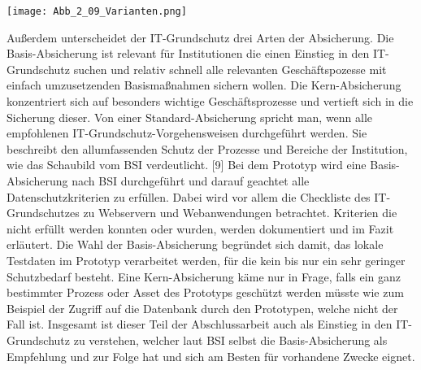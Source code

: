 \texttt{[image: Abb\_2\_09\_Varianten.png]}

Außerdem unterscheidet der IT-Grundschutz drei Arten der Absicherung. Die Basis-Absicherung ist relevant für Institutionen die einen Einstieg in den IT-Grundschutz suchen und relativ schnell alle relevanten Geschäftspozesse mit einfach umzusetzenden Basismaßnahmen sichern wollen. Die Kern-Absicherung konzentriert sich auf besonders wichtige Geschäftsprozesse und vertieft sich in die Sicherung dieser. Von einer Standard-Absicherung spricht man, wenn alle empfohlenen IT-Grundschutz-Vorgehensweisen durchgeführt werden. Sie beschreibt den allumfassenden Schutz der Prozesse und Bereiche der Institution, wie das Schaubild vom BSI verdeutlicht. [9] Bei dem Prototyp wird eine Basis-Absicherung nach BSI durchgeführt und darauf geachtet alle Datenschutzkriterien zu erfüllen. Dabei wird vor allem die Checkliste des IT-Grundschutzes zu Webservern und Webanwendungen betrachtet. Kriterien die nicht erfüllt werden konnten oder wurden, werden dokumentiert und im Fazit erläutert. Die Wahl der Basis-Absicherung begründet sich damit, das lokale Testdaten im Prototyp verarbeitet werden, für die kein bis nur ein sehr geringer Schutzbedarf besteht. Eine Kern-Absicherung käme nur in Frage, falls ein ganz bestimmter Prozess oder Asset des Prototyps geschützt werden müsste wie zum Beispiel der Zugriff auf die Datenbank durch den Prototypen, welche nicht der Fall ist. Insgesamt ist dieser Teil der Abschlussarbeit auch als Einstieg in den IT-Grundschutz zu verstehen, welcher laut BSI selbst die Basis-Absicherung als Empfehlung und zur Folge hat und sich am Besten für vorhandene Zwecke eignet.


